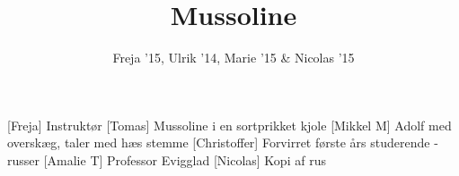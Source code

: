 \documentclass[a4paper,11pt]{article}
\title{Mussoline}
\author{Freja '15, Ulrik '14, Marie '15 \& Nicolas '15}
\begin{document}
\maketitle

\begin{roles}
[Freja] Instruktør
[Tomas] Mussoline i en sortprikket kjole 
[Mikkel M] Adolf med overskæg, taler med hæs stemme
[Christoffer] Forvirret første års studerende - russer
[Amalie T] Professor Evigglad
[Nicolas] Kopi af rus

\end{roles}

\begin{props}
\end{props}
\end{document}
